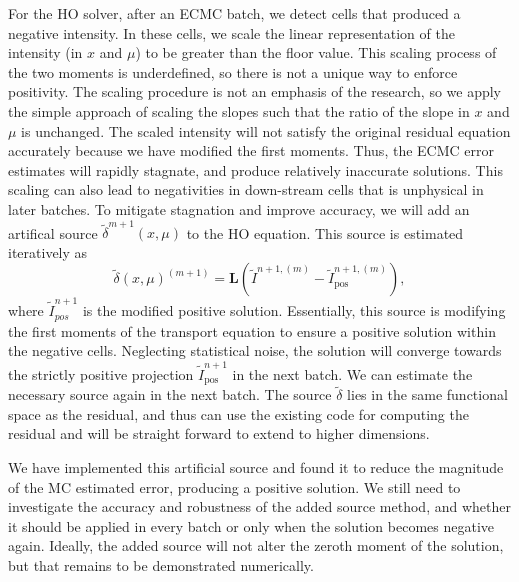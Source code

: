 \documentclass[11pt]{article}
\begin{document}
For the HO solver, after an ECMC batch, we detect cells that produced a negative
intensity. In these cells, we scale the linear representation of the intensity (in
$x$ and $\mu$) to be greater than the floor
value.  This scaling process of the two moments is underdefined, so there is not a unique way to enforce
positivity.  The scaling procedure is not an emphasis of the research, so we apply the simple
approach of scaling the slopes such that the ratio of the slope in $x$ and $\mu$ is
unchanged.  The scaled intensity will not satisfy the original residual equation accurately because we have
modified the first moments.   Thus, the ECMC error estimates will rapidly stagnate,
and produce relatively inaccurate solutions.  This scaling can also lead to
negativities in down-stream cells that is unphysical in later batches.  To mitigate
stagnation and improve accuracy, we will add an artifical source $\tilde\delta^{m+1}(x,\mu)$ to the HO equation.
This source is estimated iteratively as
\begin{equation*}
    \tilde\delta(x,\mu)^{(m+1)} = \mathbf{L}(\tilde{I}^{n+1,(m)} -
    \tilde{I}^{n+1,(m)}_{\text{pos}}),
\end{equation*}
where $\tilde{I}_{pos}^{n+1}$ is the modified positive solution.
Essentially, this source is modifying the first moments of the transport equation to ensure a positive solution within the negative cells.  Neglecting
statistical noise, the solution will converge towards the strictly positive projection
$\tilde{I}_{\text{pos}}^{n+1}$ in the next batch. We can estimate the necessary source again in the next batch.  The source
$\tilde\delta$ lies in the same functional space as the residual, and thus can use
the existing code for computing the residual and will be straight forward to extend
to higher dimensions.  

We have implemented this artificial source and found it to reduce the
magnitude of the MC estimated error, producing a positive solution. We still need to
investigate the accuracy and robustness of the
added source method, and whether it should be applied in every batch or only when the
solution becomes negative again.  Ideally, the added source will not alter the zeroth
moment of the solution, but that remains to be demonstrated numerically. 
\end{document}
